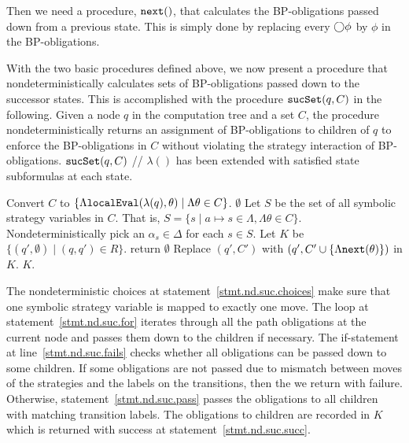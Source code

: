 Then we need a procedure, $\mbox{\tt next}()$, that calculates the BP-obligations 
passed down from a previous state. 
This is simply done by replacing every $\bigcirc\phi$ by $\phi$ in the 
BP-obligations.  

With the two basic procedures defined above, 
we now present a procedure that nondeterministically calculates 
sets of BP-obligations passed down to the successor states. 
This is accomplished with the procedure $\mbox{\tt sucSet}(q,C)$ 
in the following.  
Given a node $q$ in the computation tree and
a set $C$, the procedure 
nondeterministically returns an assignment of BP-obligations 
to children of $q$ to enforce the BP-obligations in $C$
without violating the strategy interaction of BP-obligations.  
\label{tab.nd.suc}
\procbegin
$\mbox{\tt sucSet}(q,C)$ // $\lambda()$ has been extended with 
			satisfied state subformulas at each state. 
\begin{algorithmic}[1]
\STATE Convert $C$ to 
  $\{\Lambda\mbox{\tt localEval}(\lambda(q),\theta)\mid \Lambda\theta\in C\}$.  
 \RETLINE $\emptyset$ \ENDIFLINE 
\STATE Let $S$ be the set of all symbolic strategy variables in $C$.  
  That is, $S=\{s\mid a\mapsto s\in \Lambda, \Lambda\theta\in C\}$. 
\STATE Nondeterministically pick an $\alpha_s\in \Delta$ for each 
	$s\in S$.  \label{stmt.nd.suc.choices} 
\STATE Let $K$ be $\{(q',\emptyset)\mid (q,q')\in R\}$.  
  	\label{stmt.nd.suc.for}
    return $\emptyset$ 
  \ENDIFLINE 
   \label{stmt.nd.suc.pass}  
      \STATE Replace $(q',C')$ with 
        $(q',C'\cup\{\Lambda\mbox{\tt next}(\theta)\})$ in $K$.
        \label{stmt.nd.suc.passCommit} 
    \ENDFOR
\ENDFOR 
\RETURN $K$.\label{stmt.nd.suc.succ} 
\end{algorithmic}
\procend
The nondeterministic choices at statement~\ref{stmt.nd.suc.choices} 
make sure that one symbolic strategy variable is mapped to exactly one move.  
The loop at statement~\ref{stmt.nd.suc.for} iterates through
all the path obligations at the current node and passes them down to
the children if necessary.
The if-statement at line~\ref{stmt.nd.suc.fails} checks 
whether all obligations can be passed down to some children.  
If some obligations are not passed due to mismatch between moves of the strategies 
and the labels on the transitions, then 
the we return with failure.  
Otherwise, 
statement~\ref{stmt.nd.suc.pass} passes 
the obligations to all children with matching transition labels. 
The obligations to children are recorded in $K$ which is returned with success 
at statement~\ref{stmt.nd.suc.succ}.  




